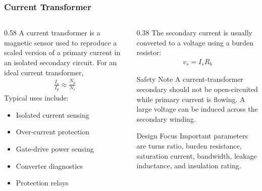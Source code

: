 \begin{frame}
    \frametitle{Current Transformer}
    \begin{columns}
        \begin{column}{0.58\textwidth}
            A current transformer is a magnetic sensor used to reproduce a scaled version of a primary current in an isolated secondary circuit. For an ideal current transformer,
            \begin{align}
                \frac{I_s}{I_p} \approx \frac{N_p}{N_s}
            \end{align}
            Typical uses include:
            \begin{itemize}
                \item Isolated current sensing
                \item Over-current protection
                \item Gate-drive power sensing
                \item Converter diagnostics
                \item Protection relays
            \end{itemize}

        \end{column}
        \begin{column}{0.38\textwidth}
            The secondary current is usually converted to a voltage using a burden resistor:
            \begin{align}
                v_s = I_s R_b
            \end{align}
            \vspace{-0.75cm}
            \begin{block}{Safety Note}
                \small
                A current-transformer secondary should not be open-circuited while primary current is flowing. A large voltage can be induced across the secondary winding.
            \end{block}
            \begin{block}{Design Focus}
                \small
                Important parameters are turns ratio, burden resistance, saturation current, bandwidth, leakage inductance, and insulation rating.
            \end{block}
        \end{column}
    \end{columns}
\end{frame}


